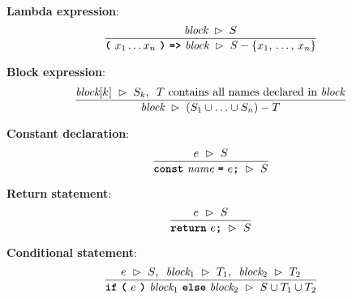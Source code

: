 \vspace{10mm}
\textbf{Lambda expression}:
\[
\frac{
  \textit{block} \ \rhd \ S
}{  
  \textbf{\texttt{(}}\ x_1 \ldots x_n \ \textbf{\texttt{)}}\ \textbf{\texttt{=>}}\ \textit{block}
  \ \rhd \
  S - \{x_1,\, \ldots,\, x_n\}
}
\]

\vspace{10mm}
\textbf{Block expression}:
\[
\frac{
  \textit{block}[k] \ \rhd \ S_k
  \text{, } \
  T \text{ contains all names declared in \textit{block}}
}{  
  \textit{block}
  \ \rhd \
  (S_1 \cup \ldots \cup S_n) - T
}
\]

\vspace{10mm}
\textbf{Constant declaration}:
\[
\frac{
  e \ \rhd \ S
}{  
  \textbf{\texttt{const}}\  \textit{name} \ 
             \textbf{\texttt{=}}\ e\textbf{\texttt{;}}
  \ \rhd \
  S
}
\]

\vspace{10mm}
\textbf{Return statement}:
\[
\frac{
  e \ \rhd \ S
}{  
  \textbf{\texttt{return}}\ e\textbf{\texttt{;}}
  \ \rhd \
  S
}
\]

\vspace{10mm}
\textbf{Conditional statement}:
\[
\frac{
  e \ \rhd \ S
  \text{, } \
  \textit{block}_1 \ \rhd \ T_1
  \text{, } \
  \textit{block}_2 \ \rhd \ T_2
}{  
  \textbf{\texttt{if}}\ 
  \textbf{\texttt{(}}\ 
  e \ 
  \textbf{\texttt{)}} \ 
  \textit{block}_1 \
  \textbf{\texttt{else}} \ 
  \textit{block}_2
  \ \rhd \
  S \cup T_1 \cup T_2
}
\]

